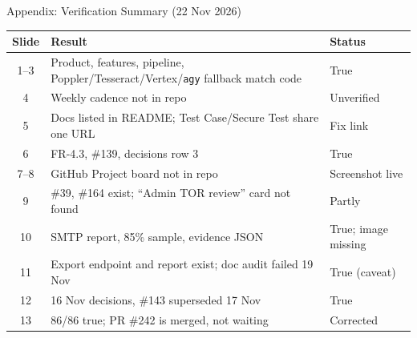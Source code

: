 \documentclass[aspectratio=169,10pt]{beamer}
\begin{document}
\begin{frame}{Appendix: Verification Summary (22 Nov 2026)}
  \footnotesize
  \begin{tabularx}{\linewidth}{@{}cXl@{}}
    \toprule
    \textbf{Slide} & \textbf{Result} & \textbf{Status}\\
    \midrule
    1--3 & Product, features, pipeline, Poppler/Tesseract/Vertex/\texttt{agy} fallback match code & \textcolor{ok}{True}\\
    4 & Weekly cadence not in repo & \textcolor{warn}{Unverified}\\
    5 & Docs listed in README; Test Case/Secure Test share one URL & \textcolor{warn}{Fix link}\\
    6 & FR-4.3, \#139, decisions row 3 & \textcolor{ok}{True}\\
    7--8 & GitHub Project board not in repo & \textcolor{warn}{Screenshot live}\\
    9 & \#39, \#164 exist; ``Admin TOR review'' card not found & \textcolor{warn}{Partly}\\
    10 & SMTP report, 85\% sample, evidence JSON & \textcolor{ok}{True}; image missing\\
    11 & Export endpoint and report exist; doc audit failed 19 Nov & \textcolor{ok}{True} (caveat)\\
    12 & 16 Nov decisions, \#143 superseded 17 Nov & \textcolor{ok}{True}\\
    13 & 86/86 true; PR \#242 is merged, not waiting & \textcolor{ok}{Corrected}\\
    \bottomrule
  \end{tabularx}
\end{frame}
\end{document}
